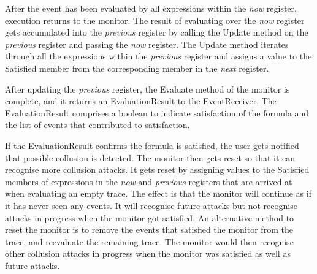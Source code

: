 After the event has been evaluated by all expressions within the \textit{now} register, execution returns to the monitor.  The result of evaluating over the \textit{now} register gets accumulated into the \textit{previous} register by calling the Update method on the \textit{previous} register and passing the \textit{now} register.  The Update method iterates through all the expressions within the \textit{previous} register and assigns a value to the Satisfied member from the corresponding member in the \textit{next} register.

After updating the \textit{previous} register, the Evaluate method of the monitor is complete, and it returns an EvaluationResult to the EventReceiver.  The EvaluationResult comprises a boolean to indicate satisfaction of the formula and the list of events that contributed to satisfaction.

If the EvaluationResult confirms the formula is satisfied, the user gets notified that possible collusion is detected.  The monitor then gets reset so that it can recognise more collusion attacks.  It gets reset by assigning values to the Satisfied members of expressions in the \textit{now} and \textit{previous} registers that are arrived at when evaluating an empty trace.  The effect is that the monitor will continue as if it has never seen any events.  It will recognise future attacks but not recognise attacks in progress when the monitor got satisfied.  An alternative method to reset the monitor is to remove the events that satisfied the monitor from the trace, and reevaluate the remaining trace.  The monitor would then recognise other collusion attacks in progress when the monitor was satisfied as well as future attacks.

